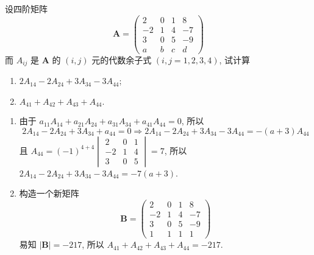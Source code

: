 \begin{example}
    设四阶矩阵 $$\boldsymbol{A}=\begin{pmatrix}
            2  & 0 & 1 & 8  \\
            -2 & 1 & 4 & -7 \\
            3  & 0 & 5 & -9 \\
            a  & b & c & d
        \end{pmatrix}$$
    而 $A_{ij}$ 是 $\boldsymbol{A}$ 的 $(i,j)$ 元的代数余子式 $(i,j=1,2,3,4)$, 试计算
    \begin{enumerate}[label=(\arabic{*})]
        \item $2A_{14}-2A_{24}+3A_{34}-3A_{44}$;
        \item $A_{41}+A_{42}+A_{43}+A_{44}.$
    \end{enumerate}
\end{example}
\begin{solution}
    \begin{enumerate}[label=(\arabic{*})]
        \item 由于 $a_{11}A_{14}+a_{21}A_{24}+a_{31}A_{34}+a_{41}A_{44}=0$, 所以
              $$2A_{14}-2A_{24}+3A_{34}+a_{44}=0\Rightarrow 2A_{14}-2A_{24}+3A_{34}-3A_{44}=-(a+3)A_{44}$$
              且 $\displaystyle A_{44}=(-1)^{4+4}\begin{vmatrix}
                      2  & 0 & 1 \\
                      -2 & 1 & 4 \\
                      3  & 0 & 5
                  \end{vmatrix}=7$, 所以 $2A_{14}-2A_{24}+3A_{34}-3A_{44}=-7(a+3)$.
        \item 构造一个新矩阵 $$\boldsymbol{B}=\begin{pmatrix}
                      2  & 0 & 1 & 8  \\
                      -2 & 1 & 4 & -7 \\
                      3  & 0 & 5 & -9 \\
                      1  & 1 & 1 & 1
                  \end{pmatrix}$$
              易知 $|\boldsymbol{B}|=-217$, 所以 $A_{41}+A_{42}+A_{43}+A_{44}=-217.$
    \end{enumerate}
\end{solution}

